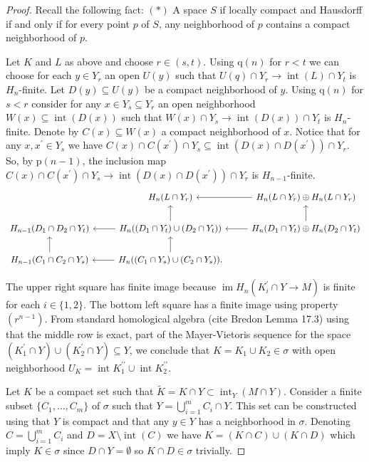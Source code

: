 \documentclass{amsart}
\theoremstyle{definition}
\newcommand{\dprime}{{\prime\prime}}
\DeclareMathOperator{\im}{im}
\DeclareMathOperator{\interior}{int}
\newcommand{\p}{\mathrm{p}}
\newcommand{\q}{\mathrm{q}}
\begin{document}
	\begin{proof}
		Recall the following fact:
		$(\ast)$ A space $S$ if locally compact and Hausdorff if and only if for every point $p$ of $S$, any neighborhood of $p$ contains a compact neighborhood of $p$.
		
		Let $K$ and $L$ as above and choose $r \in (s, t)$. Using $\q(n)$ for $r < t$ we can choose for each $y \in Y_r$ an open $U(y)$ such that $U(q) \cap Y_r \to \interior(L) \cap Y_t$ is $H_n$-finite. Let $D(y) \subseteq U(y)$ be a compact neighborhood of $y$. Using $\q(n)$ for $s < r$ consider for any $x \in Y_s \subseteq Y_r$ an open neighborhood $W(x) \subseteq \interior(D(x))$ such that $W(x) \cap Y_s \to \interior(D(x)) \cap Y_t$ is $H_n$-finite. Denote by $C(x) \subseteq W(x)$ a compact neighborhood of $x$. Notice that for any $x, x^\prime \in Y_s$ we have $C(x) \cap C(x^\prime) \cap Y_s \subseteq \interior(D(x) \cap D(x^\prime)) \cap Y_r$. So, by $\p(n-1)$, the inclusion map $C(x) \cap C(x^\prime) \cap Y_s \to \interior(D(x) \cap D(x^\prime)) \cap Y_r$ is $H_{n-1}$-finite.
		\begin{equation*}
		\begin{tikzcd}
		& H_n(L \cap Y_r) & \arrow[l] H_n(L \cap Y_r) \oplus H_n(L \cap Y_r) \\
		H_{n-1}(D_1 \cap D_2 \cap Y_t) & 
		H_n((D_1 \cap Y_t) \cup (D_2 \cap Y_t)) \arrow[l] \arrow[u] &
		\arrow[l] H_n(D_1 \cap Y_t) \oplus H_n(D_2 \cap Y_t) \arrow[u] \\
		H_{n-1}(C_1 \cap C_2 \cap Y_s) \arrow[u] & 
		H_n((C_1 \cap Y_s) \cup (C_2 \cap Y_s)) \arrow[l] \arrow[u]. &
		\end{tikzcd}
		\end{equation*}
		
		The upper right square has finite image because $\im H_n\left(K^\prime_i \cap Y \to M\right)$ is finite for each $i \in \{1, 2\}$. The bottom left square has a finite image using property $(r^{n-1})$. From standard homological algebra (cite Bredon 	Lemma 17.3) using that the middle row is exact, part of the Mayer-Vietoris sequence for the space $(K_1^\prime \cap Y) \cup (K_2^\prime \cap Y) \subseteq Y$, we conclude that $K = K_1 \cup K_2 \in \sigma$ with open neighborhood $U_K = \interior K^\dprime_1 \cup \interior K^\dprime_2$.
		
		Let $K$ be a compact set such that $\widetilde K = K \cap Y \subset \interior_Y(M \cap Y)$.
		Consider a finite subset $\{C_1, \dots, C_m\}$ of $\sigma$ such that $Y = \bigcup_{i=1}^m C_i \cap Y$. This set can be constructed using that $Y$ is compact and that any $y \in Y$ has a neighborhood in $\sigma$. Denoting $C = \bigcup_{i=1}^m C_i$ and $D = X \setminus \interior(C)$ we have $K = (K \cap C) \cup (K \cap D)$ which imply $K \in \sigma$ since $D \cap Y = \emptyset$ so $K \cap D \in \sigma$ trivially.
	\end{proof}
\end{document}
